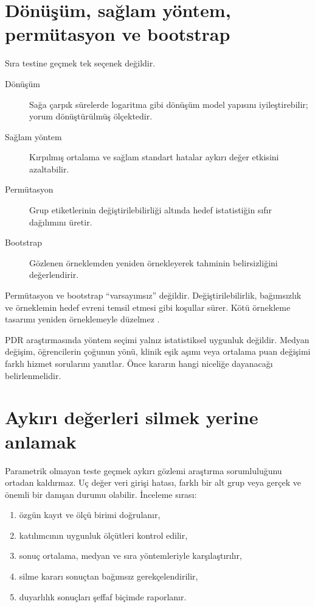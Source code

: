 \section{Dönüşüm, sağlam yöntem, permütasyon ve bootstrap}

Sıra testine geçmek tek seçenek değildir.

\begin{description}
  \item[Dönüşüm] Sağa çarpık sürelerde logaritma gibi dönüşüm model yapısını iyileştirebilir; yorum dönüştürülmüş ölçektedir.
  \item[Sağlam yöntem] Kırpılmış ortalama ve sağlam standart hatalar aykırı değer etkisini azaltabilir.
  \item[Permütasyon] Grup etiketlerinin değiştirilebilirliği altında hedef istatistiğin sıfır dağılımını üretir.
  \item[Bootstrap] Gözlenen örneklemden yeniden örnekleyerek tahminin belirsizliğini değerlendirir.
\end{description}

Permütasyon ve bootstrap ``varsayımsız'' değildir. Değiştirilebilirlik,
bağımsızlık ve örneklemin hedef evreni temsil etmesi gibi koşullar sürer.
Kötü örnekleme tasarımı yeniden örneklemeyle düzelmez
\cite{efron1993,wasserman2006}.

\begin{researchbox}
PDR araştırmasında yöntem seçimi yalnız istatistiksel uygunluk değildir.
Medyan değişim, öğrencilerin çoğunun yönü, klinik eşik aşımı veya ortalama
puan değişimi farklı hizmet sorularını yanıtlar. Önce kararın hangi niceliğe
dayanacağı belirlenmelidir.
\end{researchbox}

\section{Aykırı değerleri silmek yerine anlamak}

Parametrik olmayan teste geçmek aykırı gözlemi araştırma sorumluluğunu ortadan
kaldırmaz. Uç değer veri girişi hatası, farklı bir alt grup veya gerçek ve
önemli bir danışan durumu olabilir. İnceleme sırası:

\begin{enumerate}
  \item özgün kayıt ve ölçü birimi doğrulanır,
  \item katılımcının uygunluk ölçütleri kontrol edilir,
  \item sonuç ortalama, medyan ve sıra yöntemleriyle karşılaştırılır,
  \item silme kararı sonuçtan bağımsız gerekçelendirilir,
  \item duyarlılık sonuçları şeffaf biçimde raporlanır.
\end{enumerate}

